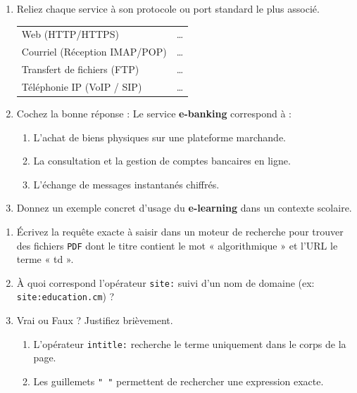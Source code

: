 \documentclass[11pt]{article}
\begin{document}
\begin{exercice}
\begin{enumerate}
    \item Reliez chaque service à son protocole ou port standard le plus associé.
    \begin{tabular}{ll}
        Web (HTTP/HTTPS) & \ldots \\
        Courriel (Réception IMAP/POP) & \ldots \\
        Transfert de fichiers (FTP) & \ldots \\
        Téléphonie IP (VoIP / SIP) & \ldots \\
    \end{tabular}
    \item Cochez la bonne réponse : Le service \textbf{e-banking} correspond à :
    \begin{enumerate}
        \item L'achat de biens physiques sur une plateforme marchande.
        \item La consultation et la gestion de comptes bancaires en ligne.
        \item L'échange de messages instantanés chiffrés.
    \end{enumerate}
    \item Donnez un exemple concret d'usage du \textbf{e-learning} dans un contexte scolaire.
\end{enumerate}
\end{exercice}

\begin{exercice}
\begin{enumerate}
    \item Écrivez la requête exacte à saisir dans un moteur de recherche pour trouver des fichiers \texttt{PDF} dont le titre contient le mot « algorithmique » et l'URL le terme « td ».
    \item À quoi correspond l'opérateur \texttt{site:} suivi d'un nom de domaine (ex: \texttt{site:education.cm}) ?
    \item Vrai ou Faux ? Justifiez brièvement.
    \begin{enumerate}
        \item L'opérateur \texttt{intitle:} recherche le terme uniquement dans le corps de la page.
        \item Les guillemets \texttt{" "} permettent de rechercher une expression exacte.
    \end{enumerate}
\end{enumerate}
\end{exercice}
\end{document}
